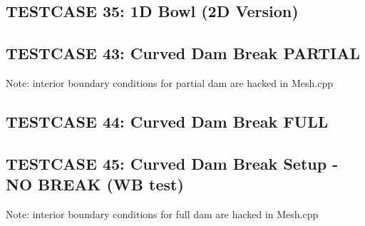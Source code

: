 \documentclass[times,sort]{elsarticle}
\theoremstyle{plain}
\theoremstyle{proofpartstyle} \newtheorem*{proofpart}{Proof of Part}
\theoremstyle{plain}
\theoremstyle{remark}
\numberwithin{equation}{section}
\begin{document}
\subsection{TESTCASE 35: 1D Bowl (2D Version)}
\subsection{TESTCASE 43: Curved Dam Break PARTIAL}
Note: interior boundary conditions for partial dam are hacked in Mesh.cpp
\subsection{TESTCASE 44: Curved Dam Break FULL}
\subsection{TESTCASE 45: Curved Dam Break Setup - NO BREAK (WB test)}
Note: interior boundary conditions for full dam are hacked in Mesh.cpp
\end{document}
